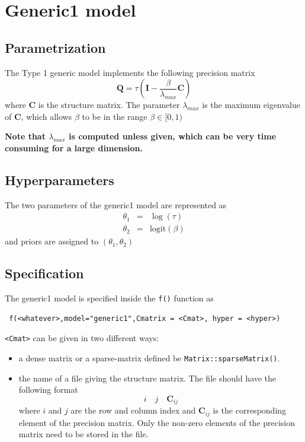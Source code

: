 \documentclass[a4paper,11pt]{article}
\begin{document}
\section*{Generic1 model}

\subsection*{Parametrization}

The Type 1 generic model implements the following precision matrix
\[
\mathbf{Q}=\tau(\mathbf{I}-\frac{\beta}{\lambda_{max}}\mathbf{C})
\]
where $\mathbf{C}$ is the structure matrix. The parameter
$\lambda_{max}$ is the maximum eigenvalue of $\mathbf{C}$, which
allows $\beta$ to be in the range $\beta\in[0,1)$

\textbf{Note that $\lambda_{max}$ is computed unless given, which can be very
time consuming for a large dimension.}

\subsection*{Hyperparameters}

The two parameters of the generic1 model are represented as
\begin{eqnarray*}
    \theta_1 &= & \log(\tau)\\
    \theta_2 &=&\text{logit}(\beta)
\end{eqnarray*}
and priors are assigned to $(\theta_1,\theta_2)$

\subsection*{Specification}

The generic1 model is specified inside the {\tt f()} function as
\begin{verbatim}
 f(<whatever>,model="generic1",Cmatrix = <Cmat>, hyper = <hyper>)
\end{verbatim}
{\tt <Cmat>} can be given in two different ways:
\begin{itemize}
\item a dense matrix or a sparse-matrix defined be
    \texttt{Matrix::sparseMatrix()}.
\item the name of a file giving the structure matrix. The file should
    have the following format
    \[
    i\quad j\quad \mathbf{C}_{ij}
    \]
    where $i$ and $j$ are the row and column index and
    $\mathbf{C}_{ij}$ is the corresponding element of the precision
    matrix. Only the non-zero elements of the precision matrix need to
    be stored in the file.
\end{itemize}
\end{document}
